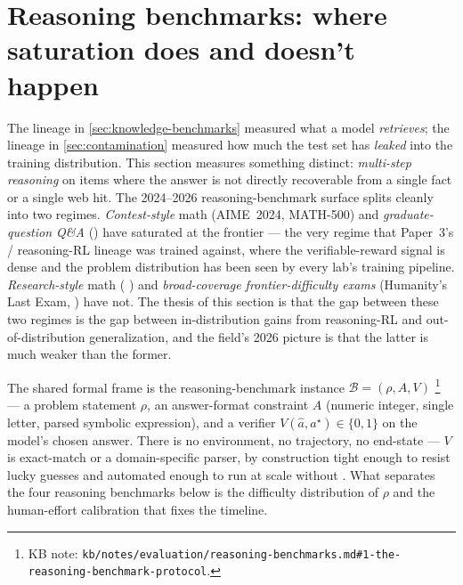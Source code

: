 
\section{Reasoning benchmarks: where saturation does and doesn't happen}
\label{sec:reasoning-benchmarks}

The lineage in \cref{sec:knowledge-benchmarks} measured what a model
\emph{retrieves}; the lineage in \cref{sec:contamination} measured how
much the test set has \emph{leaked} into the training distribution.
This section measures something distinct: \emph{multi-step reasoning}
on items where the answer is not directly recoverable from a single
fact or a single web hit. The 2024--2026 reasoning-benchmark surface
splits cleanly into two regimes. \emph{Contest-style} math
(AIME~2024, MATH-500) and \emph{graduate-question Q\&A} ()
have saturated at the frontier --- the very regime that Paper~3's
/ reasoning-RL lineage was trained against, where the
verifiable-reward signal is dense and the problem distribution has
been seen by every lab's training pipeline. \emph{Research-style}
math ( \citep{glazer2024-frontiermath}) and
\emph{broad-coverage frontier-difficulty exams} (Humanity's Last
Exam,  \citep{phan2025-hle}) have not. The thesis of this section
is that the gap between these two regimes is the gap between
in-distribution gains from reasoning-RL and out-of-distribution
generalization, and the field's 2026 picture is that the latter is
much weaker than the former.

The shared formal frame is the reasoning-benchmark instance
$\mathcal{B} = (\rho, A, V)$%
\footnote{KB note: \nolinkurl{kb/notes/evaluation/reasoning-benchmarks.md#1-the-reasoning-benchmark-protocol}.}
--- a problem statement $\rho$, an answer-format constraint $A$
(numeric integer, single letter, parsed symbolic expression), and
a verifier $V(\hat{a}, a^\star) \in \{0, 1\}$ on the model's chosen
answer. There is no environment, no trajectory, no end-state ---
$V$ is exact-match or a domain-specific parser, by construction tight
enough to resist lucky guesses and automated enough to run at scale
without . What separates the four reasoning benchmarks
below is the difficulty distribution of $\rho$ and the human-effort
calibration that fixes the  timeline.

